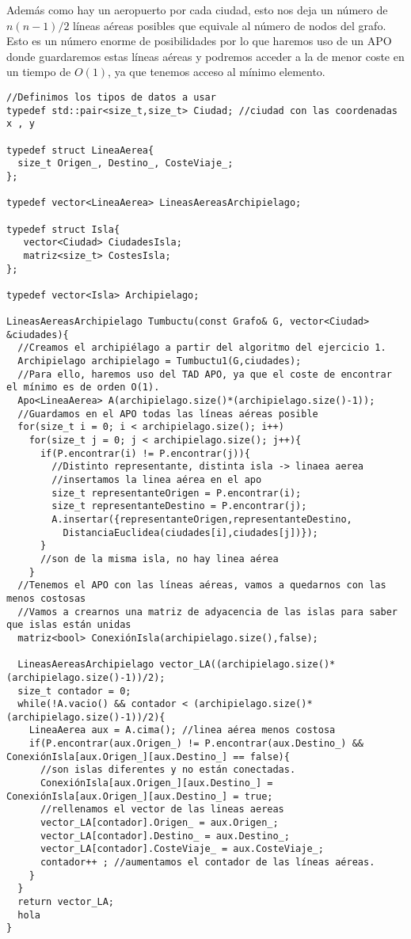 Además como hay un aeropuerto por cada ciudad, esto nos deja un número de \(n(n-1)/2\) líneas aéreas posibles que equivale al número de nodos del grafo. Esto es un número enorme de posibilidades por lo que haremos uso de un APO donde guardaremos estas líneas aéreas y podremos acceder a la de menor coste en un tiempo de \(O(1)\), ya que tenemos acceso al mínimo elemento.      

\begin{verbatim}
//Definimos los tipos de datos a usar
typedef std::pair<size_t,size_t> Ciudad; //ciudad con las coordenadas x , y

typedef struct LineaAerea{
  size_t Origen_, Destino_, CosteViaje_;
};

typedef vector<LineaAerea> LineasAereasArchipielago;

typedef struct Isla{
   vector<Ciudad> CiudadesIsla;
   matriz<size_t> CostesIsla;
};

typedef vector<Isla> Archipielago;

LineasAereasArchipielago Tumbuctu(const Grafo& G, vector<Ciudad> &ciudades){
  //Creamos el archipiélago a partir del algoritmo del ejercicio 1.
  Archipielago archipielago = Tumbuctu1(G,ciudades);
  //Para ello, haremos uso del TAD APO, ya que el coste de encontrar el mínimo es de orden O(1).
  Apo<LineaAerea> A(archipielago.size()*(archipielago.size()-1));
  //Guardamos en el APO todas las líneas aéreas posible
  for(size_t i = 0; i < archipielago.size(); i++)
    for(size_t j = 0; j < archipielago.size(); j++){
      if(P.encontrar(i) != P.encontrar(j)){
        //Distinto representante, distinta isla -> linaea aerea
        //insertamos la linea aérea en el apo
        size_t representanteOrigen = P.encontrar(i);
        size_t representanteDestino = P.encontrar(j);
        A.insertar({representanteOrigen,representanteDestino,
          DistanciaEuclidea(ciudades[i],ciudades[j])});
      }
      //son de la misma isla, no hay linea aérea
    }
  //Tenemos el APO con las líneas aéreas, vamos a quedarnos con las menos costosas
  //Vamos a crearnos una matriz de adyacencia de las islas para saber que islas están unidas
  matriz<bool> ConexiónIsla(archipielago.size(),false);

  LineasAereasArchipielago vector_LA((archipielago.size()*(archipielago.size()-1))/2);
  size_t contador = 0;
  while(!A.vacio() && contador < (archipielago.size()*(archipielago.size()-1))/2){
    LineaAerea aux = A.cima(); //linea aérea menos costosa
    if(P.encontrar(aux.Origen_) != P.encontrar(aux.Destino_) && ConexiónIsla[aux.Origen_][aux.Destino_] == false){ 
      //son islas diferentes y no están conectadas. 
      ConexiónIsla[aux.Origen_][aux.Destino_] = ConexiónIsla[aux.Origen_][aux.Destino_] = true;
      //rellenamos el vector de las lineas aereas
      vector_LA[contador].Origen_ = aux.Origen_;
      vector_LA[contador].Destino_ = aux.Destino_;
      vector_LA[contador].CosteViaje_ = aux.CosteViaje_;
      contador++ ; //aumentamos el contador de las líneas aéreas.
    }
  }
  return vector_LA;
  hola
}
\end{verbatim}


